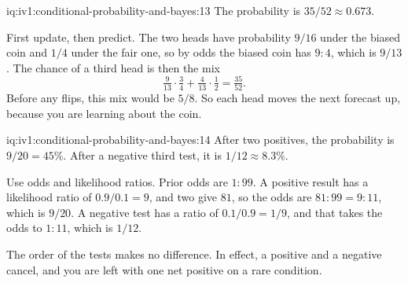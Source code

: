 \begin{solution}{iq:iv1:conditional-probability-and-bayes:13}
The probability is $35/52 \approx 0.673$.

First update, then predict. The two heads have probability $9/16$ under the biased coin and $1/4$ under the fair one, so by odds the biased coin has $9 : 4$, which is $9/13$. The chance of a third head is then the mix
\[
\tfrac{9}{13} \cdot \tfrac34 + \tfrac{4}{13} \cdot \tfrac12 = \tfrac{35}{52}.
\]
Before any flips, this mix would be $5/8$. So each head moves the next forecast up, because you are learning about the coin.

\end{solution}

\begin{solution}{iq:iv1:conditional-probability-and-bayes:14}
After two positives, the probability is $9/20 = 45\%$. After a negative third test, it is $1/12 \approx 8.3\%$.

Use odds and likelihood ratios. Prior odds are $1 : 99$. A positive result has a likelihood ratio of $0.9/0.1 = 9$, and two give $81$, so the odds are $81 : 99 = 9 : 11$, which is $9/20$. A negative test has a ratio of $0.1/0.9 = 1/9$, and that takes the odds to $1 : 11$, which is $1/12$.

The order of the tests makes no difference. In effect, a positive and a negative cancel, and you are left with one net positive on a rare condition.

\end{solution}

